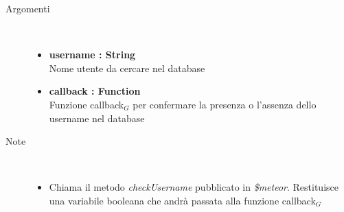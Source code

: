 \begin{description}
\begin{description}
		\begin{description}
			\item[Argomenti] \hfill \\
				\begin{itemize}
					\item \textbf{username : String			} \hfill \\
					Nome utente da cercare nel database
					\item \textbf{callback : Function			} \hfill \\
					Funzione callback$_G$ per confermare la presenza o l'assenza dello username nel database
					
				\end{itemize}
			\item[Note] \hfill \\
			\begin{itemize}
					\item Chiama il metodo \textit{checkUsername} pubblicato in \textit{\$meteor}. Restituisce una variabile booleana che andrà passata alla funzione callback$_G$
			\end{itemize}
		\end{description}
	\end{description}

\end{description}






































